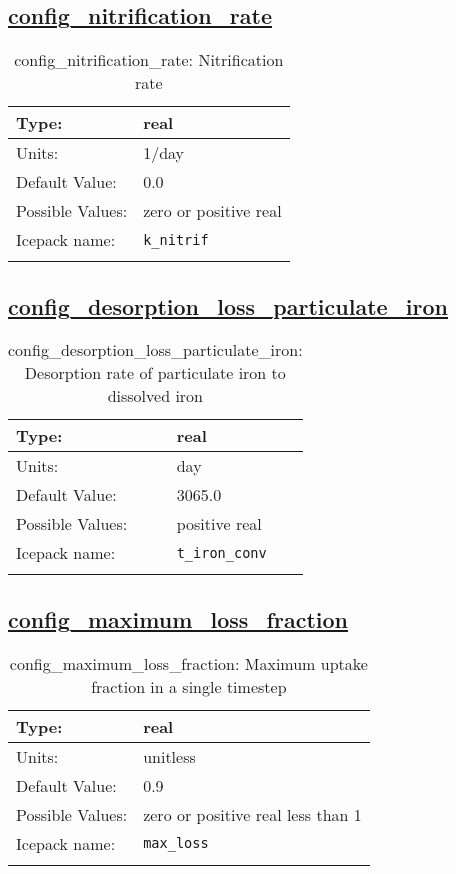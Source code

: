 \subsection[config\_nitrification\_rate]{\hyperref[sec:nm_tab_biogeochemistry]{config\_nitrification\_rate}}
\label{subsec:nm_sec_config_nitrification_rate}
\begin{center}
\begin{longtable}{| p{2.0in} || p{4.0in} |}
    \hline
    Type: & real \\
    \hline
    Units: & \si{1/day} \\
    \hline
    Default Value: & 0.0 \\
    \hline
    Possible Values: & zero or positive real \\
    \hline
    Icepack name: & \verb+k_nitrif+ \\
    \hline
    \caption{config\_nitrification\_rate: Nitrification rate}
\end{longtable}
\end{center}
\subsection[config\_desorption\_loss\_particulate\_iron]{\hyperref[sec:nm_tab_biogeochemistry]{config\_desorption\_loss\_particulate\_iron}}
\label{subsec:nm_sec_config_desorption_loss_particulate_iron}
\begin{center}
\begin{longtable}{| p{2.0in} || p{4.0in} |}
    \hline
    Type: & real \\
    \hline
    Units: & \si{day} \\
    \hline
    Default Value: & 3065.0 \\
    \hline
    Possible Values: & positive real \\
    \hline
    Icepack name: & \verb+t_iron_conv+ \\
    \hline
    \caption{config\_desorption\_loss\_particulate\_iron: Desorption rate of particulate iron to dissolved iron}
\end{longtable}
\end{center}
\subsection[config\_maximum\_loss\_fraction]{\hyperref[sec:nm_tab_biogeochemistry]{config\_maximum\_loss\_fraction}}
\label{subsec:nm_sec_config_maximum_loss_fraction}
\begin{center}
\begin{longtable}{| p{2.0in} || p{4.0in} |}
    \hline
    Type: & real \\
    \hline
    Units: & \si{unitless} \\
    \hline
    Default Value: & 0.9 \\
    \hline
    Possible Values: & zero or positive real less than 1 \\
    \hline
    Icepack name: & \verb+max_loss+ \\
    \hline
    \caption{config\_maximum\_loss\_fraction: Maximum uptake fraction in a single timestep}
\end{longtable}
\end{center}
